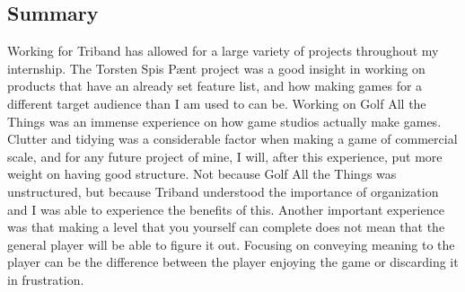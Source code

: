 \subsection{Summary}
Working for Triband has allowed for a large variety of projects throughout my internship. The Torsten Spis P{\ae}nt project was a good insight in working on products that have an already set feature list, and how making games for a different target audience than I am used to can be. Working on Golf All the Things was an immense experience on how game studios actually make games. Clutter and tidying was a considerable factor when making a game of commercial scale, and for any future project of mine, I will, after this experience, put more weight on having good structure. Not because Golf All the Things was unstructured, but because Triband understood the importance of organization and I was able to experience the benefits of this. Another important experience was that making a level that you yourself can complete does not mean that the general player will be able to figure it out. Focusing on conveying meaning to the player can be the difference between the player enjoying the game or discarding it in frustration.
